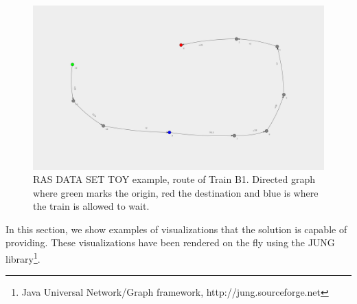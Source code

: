 \documentclass[10pt,a4paper,draft]{article}
\begin{document}
\begin{figure}
\includegraphics[width=150mm,angle=90]{B1.png}
\centering
\caption{RAS DATA SET TOY example, route of Train B1. Directed graph where green marks the origin, red the destination and blue is where the train is allowed to wait.}
\end{figure}

In this section, we show examples of visualizations that the solution is capable of providing. These visualizations have been rendered on the fly using the JUNG library\footnote{Java Universal Network/Graph framework, http://jung.sourceforge.net}.
\end{document}
